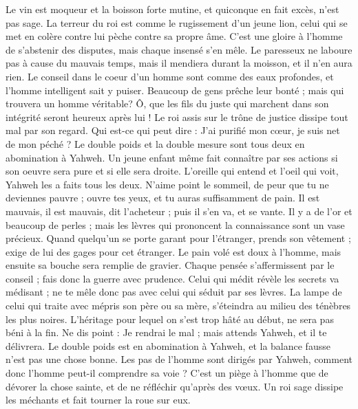\begin{multicols}{2}
\VerseOne{}Le vin est moqueur et la boisson forte mutine, et quiconque en fait excès, n'est pas sage.
La terreur du roi est comme le rugissement d'un jeune lion, celui qui se met en colère contre lui pèche contre sa propre âme.
C'est une gloire à l'homme de s'abstenir des disputes, mais chaque insensé s'en mêle.
Le paresseux ne laboure pas à cause du mauvais temps, mais il mendiera durant la moisson, et il n'en aura rien.
Le conseil dans le coeur d'un homme sont comme des eaux profondes, et l'homme intelligent sait y puiser.
Beaucoup de gens prêche leur bonté ; mais qui trouvera un homme véritable?
Ô, que les fils du juste qui marchent dans son intégrité seront heureux après lui !
Le roi assis sur le trône de justice dissipe tout mal par son regard.
Qui est-ce qui peut dire : J'ai purifié mon cœur, je suis net de mon péché ?
Le double poids et la double mesure sont tous deux en abomination à Yahweh.
Un jeune enfant même fait connaître par ses actions si son oeuvre sera pure et  si elle sera droite.
L'oreille qui entend et l'oeil qui voit, Yahweh les a faits tous les deux.
N'aime point le sommeil, de peur que tu ne deviennes pauvre ; ouvre tes yeux, et tu auras suffisamment de pain.
Il est mauvais, il est mauvais, dit l'acheteur ; puis il s'en va, et se vante.
Il y a de l'or et beaucoup de perles ; mais les lèvres qui prononcent la connaissance sont un vase précieux.
Quand quelqu'un se porte garant pour l'étranger, prends son vêtement ; exige de lui des gages pour cet étranger.
Le pain volé est doux à l'homme, mais ensuite sa bouche sera remplie de gravier.
Chaque pensée s'affermissent par le conseil ; fais donc la guerre avec prudence.
Celui qui médit révèle les secrets va médisant ; ne te mêle donc pas avec celui qui séduit par ses lèvres.
La lampe de celui qui traite avec mépris son père ou sa mère, s'éteindra au milieu des ténèbres les plus noires.
L'héritage pour lequel on s'est trop hâté au début, ne sera pas béni à la fin.
Ne dis point : Je rendrai le mal ; mais attends Yahweh, et il te délivrera.
Le double poids est en abomination à Yahweh, et la balance fausse n'est pas une chose bonne.
Les pas de l'homme sont dirigés par Yahweh, comment donc l'homme peut-il comprendre sa voie ?
C'est un piège à l'homme que de dévorer la chose sainte, et de ne réfléchir qu'après des vœux.
Un roi sage dissipe les méchants et fait tourner la roue sur eux.

\end{multicols}
